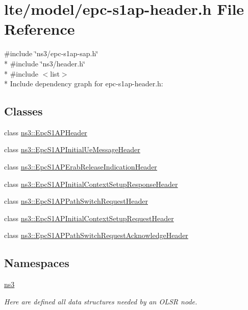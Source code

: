 \hypertarget{epc-s1ap-header_8h}{}\section{lte/model/epc-\/s1ap-\/header.h File Reference}
\label{epc-s1ap-header_8h}
{\ttfamily \#include \char`\"{}ns3/epc-\/s1ap-\/sap.\+h\char`\"{}}\\*
{\ttfamily \#include \char`\"{}ns3/header.\+h\char`\"{}}\\*
{\ttfamily \#include $<$list$>$}\\*
Include dependency graph for epc-\/s1ap-\/header.h\+:
\subsection*{Classes}
\begin{DoxyCompactItemize}
\item 
class \hyperlink{classns3_1_1EpcS1APHeader}{ns3\+::\+Epc\+S1\+A\+P\+Header}
\item 
class \hyperlink{classns3_1_1EpcS1APInitialUeMessageHeader}{ns3\+::\+Epc\+S1\+A\+P\+Initial\+Ue\+Message\+Header}
\item 
class \hyperlink{classns3_1_1EpcS1APErabReleaseIndicationHeader}{ns3\+::\+Epc\+S1\+A\+P\+Erab\+Release\+Indication\+Header}
\item 
class \hyperlink{classns3_1_1EpcS1APInitialContextSetupResponseHeader}{ns3\+::\+Epc\+S1\+A\+P\+Initial\+Context\+Setup\+Response\+Header}
\item 
class \hyperlink{classns3_1_1EpcS1APPathSwitchRequestHeader}{ns3\+::\+Epc\+S1\+A\+P\+Path\+Switch\+Request\+Header}
\item 
class \hyperlink{classns3_1_1EpcS1APInitialContextSetupRequestHeader}{ns3\+::\+Epc\+S1\+A\+P\+Initial\+Context\+Setup\+Request\+Header}
\item 
class \hyperlink{classns3_1_1EpcS1APPathSwitchRequestAcknowledgeHeader}{ns3\+::\+Epc\+S1\+A\+P\+Path\+Switch\+Request\+Acknowledge\+Header}
\end{DoxyCompactItemize}
\subsection*{Namespaces}
\begin{DoxyCompactItemize}
\item 
 \hyperlink{namespacens3}{ns3}
\begin{DoxyCompactList}\small\item\em Here are defined all data structures needed by an O\+L\+SR node. \end{DoxyCompactList}\end{DoxyCompactItemize}
